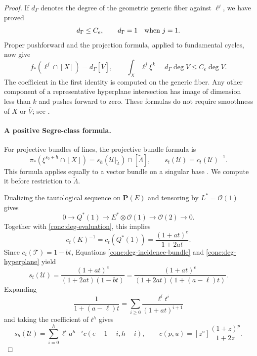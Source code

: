 \begin{proof}
If \(d_\Gamma\) denotes the degree of the geometric generic
fiber against \(\ell^j\), we have proved
\begin{equation}
 d_\Gamma\le C_e,
 \qquad d_\Gamma=1\quad\hbox{when }j=1.
 \label{conc:deg-fiber-degree}
\end{equation}
Proper pushforward and the projection formula, applied to
fundamental cycles, now give
\begin{equation}
 f_*(\ell^j\cap[X])=d_\Gamma[\overline V],
 \qquad
 \int_X\ell^j\xi^k=d_\Gamma\deg V\le C_e\deg V.
 \label{conc:deg-point-integral}
\end{equation}
The coefficient in the first identity is computed on the generic
fiber.  Any other component of a representative hyperplane
intersection has image of dimension less than \(k\) and pushes
forward to zero.  These formulas do not require smoothness of
\(X\) or \(\overline V\); see
\cite[Sections 1.4, 2.3, 2.5]{fulton1998}.

\paragraph{A positive Segre-class formula.}
For projective bundles of lines, the projective bundle formula is
\begin{equation}
 \pi_*(\xi^{s_0+h}\cap[X])
   =s_h(\mathcal U|_{\widetilde\Lambda})
      \cap[\widetilde\Lambda],
 \qquad s_t(\mathcal U)=c_t(\mathcal U)^{-1}.
 \label{conc:deg-projective-bundle}
\end{equation}
This formula applies equally to a vector bundle on a singular
base \cite[Sections 3.1--3.3]{fulton1998}.  We compute it before
restriction to \(\widetilde\Lambda\).

Dualizing the tautological sequence on \(\mathbf{P}(E)\) and
tensoring by \(L^*=\mathcal O(1)\) gives
\[
 0\longrightarrow Q^*(1)
 \longrightarrow E^*\otimes\mathcal O(1)
 \longrightarrow\mathcal O(2)\longrightarrow0.
\]
Together with \eqref{conc:deg-evaluation}, this implies
\[
 c_t(K)^{-1}=c_t(Q^*(1))=\frac{(1+at)^e}{1+2at}.
\]
Since \(c_t(\mathcal T)=1-bt\), Equations
\eqref{conc:deg-incidence-bundle} and
\eqref{conc:deg-hyperplane} yield
\begin{equation}
 s_t(\mathcal U)
   =\frac{(1+at)^e}{(1+2at)(1-bt)}
   =\frac{(1+at)^e}{(1+2at)(1+(a-\ell)t)}.
 \label{conc:deg-segre-series}
\end{equation}
Expanding
\[
 \frac{1}{1+(a-\ell)t}
   =\sum_{i\ge0}\frac{\ell^i t^i}{(1+at)^{i+1}}
\]
and taking the coefficient of \(t^h\) gives
\begin{equation}
 s_h(\mathcal U)
 =\sum_{i=0}^h \ell^i a^{h-i}c(e-1-i,h-i),
 \qquad
 c(p,u)=[z^u]\frac{(1+z)^p}{1+2z}.
 \label{conc:deg-segre-coefficients}
\end{equation}


\end{proof}
